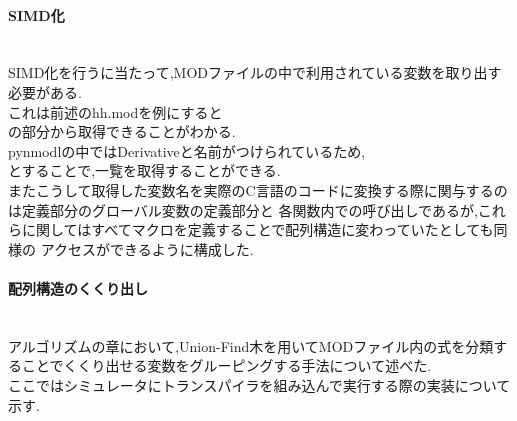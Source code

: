 \paragraph{SIMD化}~\\
SIMD化を行うに当たって,MODファイルの中で利用されている変数を取り出す必要がある.\\
これは前述のhh.modを例にすると\\

の部分から取得できることがわかる.\\
pynmodlの中ではDerivativeと名前がつけられているため,\\

とすることで,一覧を取得することができる.\\
またこうして取得した変数名を実際のC言語のコードに変換する際に関与するのは定義部分のグローバル変数の定義部分と
各関数内での呼び出しであるが,これらに関してはすべてマクロを定義することで配列構造に変わっていたとしても同様の
アクセスができるように構成した.\\

\paragraph{配列構造のくくり出し}~\\
アルゴリズムの章において,Union-Find木を用いてMODファイル内の式を分類することでくくり出せる変数をグルーピングする手法について述べた.\\
ここではシミュレータにトランスパイラを組み込んで実行する際の実装について示す.\\
